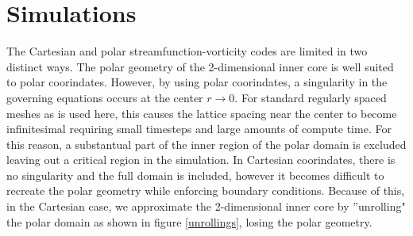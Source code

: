 \documentclass{article}
\begin{document}
\section*{Simulations}
The Cartesian and polar streamfunction-vorticity codes are limited in two 
distinct ways. The polar geometry of the 2-dimensional inner core is well 
suited to polar coorindates. However, by using polar coorindates, a 
singularity in the governing equations occurs at the center 
$r \rightarrow 0$. For standard regularly spaced meshes as is used here, 
this causes the lattice spacing near the center to become infinitesimal 
requiring small timesteps and large amounts of compute time. For this 
reason, a substantual part of the inner region of the polar domain is excluded leaving out a 
critical region in the simulation. In Cartesian coorindates, there is no 
singularity and the full domain is included, however it becomes difficult 
to recreate the polar geometry while enforcing boundary conditions. Because of this, in the Cartesian case, we approximate the 2-dimensional inner core 
by ''unrolling" the polar domain as shown in figure \ref{unrollings}, losing the polar geometry.
\end{document}
